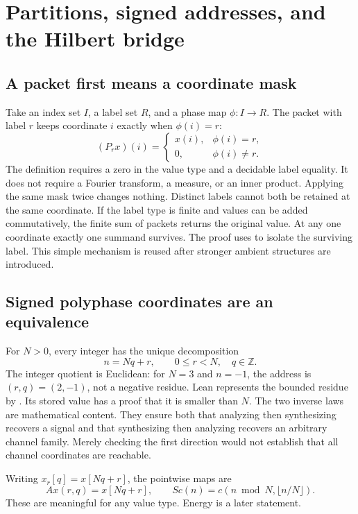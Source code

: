 \section{Partitions, signed addresses, and the Hilbert bridge}
\subsection{A packet first means a coordinate mask}
Take an index set $I$, a label set $R$, and a phase map $\phi:I\to R$. The packet with label $r$ keeps coordinate $i$ exactly when $\phi(i)=r$:
\[
(P_r x)(i)=\begin{cases}x(i),&\phi(i)=r,\\0,&\phi(i)\ne r.\end{cases}
\]
The definition requires a zero in the value type and a decidable label equality. It does not require a Fourier transform, a measure, or an inner product.
Applying the same mask twice changes nothing. Distinct labels cannot both be retained at the same coordinate. If the label type is finite and values can be added commutatively, the finite sum of packets returns the original value. At any one coordinate exactly one summand survives.
The proof uses  to isolate the surviving label. This simple mechanism is reused after stronger ambient structures are introduced.

\subsection{Signed polyphase coordinates are an equivalence}
For $N>0$, every integer has the unique decomposition
\[
n=Nq+r,\qquad 0\le r<N,\quad q\in\mathbb Z.
\]
The integer quotient is Euclidean: for $N=3$ and $n=-1$, the address is $(r,q)=(2,-1)$, not a negative residue. Lean represents the bounded residue by . Its stored value has a proof that it is smaller than $N$.
The two inverse laws are mathematical content. They ensure both that analyzing then synthesizing recovers a signal and that synthesizing then analyzing recovers an arbitrary channel family. Merely checking the first direction would not establish that all channel coordinates are reachable.

Writing $x_r[q]=x[Nq+r]$, the pointwise maps are
\[
Ax(r,q)=x[Nq+r],\qquad Sc(n)=c(n\bmod N,\lfloor n/N\rfloor).
\]
These are meaningful for any value type. Energy is a later statement.

